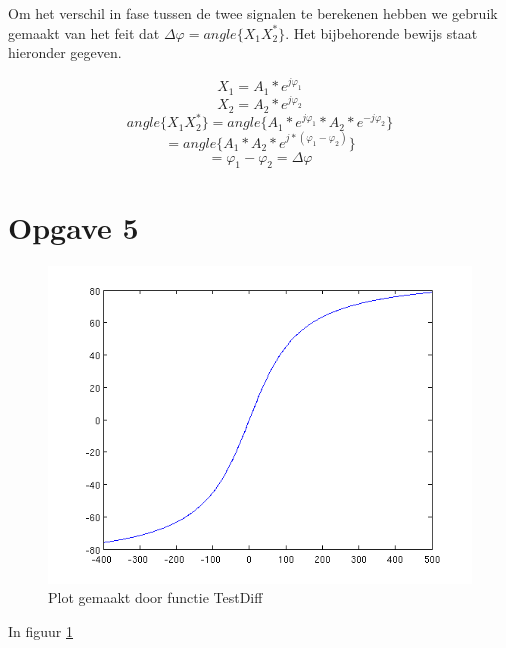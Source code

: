 \documentclass{article}
\begin{document}
Om het verschil in fase tussen de twee signalen te berekenen hebben we gebruik gemaakt van het feit dat $\Delta\varphi = angle\{X_{1}X_{2}^{*}\}$. Het bijbehorende bewijs staat hieronder gegeven.

$$X_{1} = A_{1}*e^{j\varphi_{1}}$$
$$X_{2} = A_{2}*e^{j\varphi_{2}}$$
$$angle\{X_{1}X_{2}^{*}\} = angle\{A_{1}*e^{j\varphi_{1}} * A_{2}*e^{-j\varphi_{2}}\}$$
$$= angle\{A_{1}*A_{2}*e^{j*(\varphi_{1}-\varphi_{2})}\}$$
$$= \varphi_{1}-\varphi_{2} = \Delta\varphi$$

\section{Opgave 5}
\begin{figure}
	\center
	\includegraphics{5a.png}
	\caption{Plot gemaakt door functie TestDiff}
 \label{5a}
\end{figure}


In figuur \ref{5a}

\begin{figure}
 \label{5b}
\end{figure}
\end{document}
